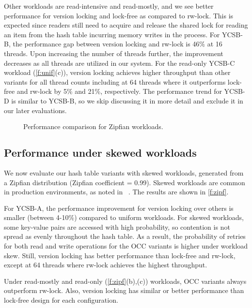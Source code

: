 Other workloads are read-intensive and read-mostly, and we see better
performance for version locking and lock-free as compared to rw-lock. This is expected since
readers still need to acquire and release the shared lock for reading an item from the
hash table incurring memory writes in the process. For YCSB-B, the performance gap between
version locking and rw-lock is 46\% at 16 threads. Upon increasing the number of threads
further, the improvement decreases as all threads are utilized in our system. For the
read-only YCSB-C workload (\autoref{f:unif}(c)), version locking achieves higher
throughput than other variants for all thread counts including at 64 threads where it
outperforms lock-free and rw-lock by 5\% and 21\%, respectively. The performance trend for
YCSB-D is similar to YCSB-B, so we skip discussing it in more detail and exclude it in our
later evaluations.


\begin{figure*}[t]
    \centering
    
    \caption{Performance comparison for Zipfian workloads.}
    \label{f:zipf}
    \vspace{-8pt}
\end{figure*}

\subsection{Performance under skewed workloads}
\label{s:eval:skew}
We now evaluate our hash table variants with skewed workloads, generated from
a Zipfian distribution (Zipfian coefficient = 0.99). Skewed workloads are common
in production environments, as noted in ~\cite{ycsb-cooper-socc10, hotring-chen-fast20}.
The results are shown in \autoref{f:zipf}.

For YCSB-A, the performance improvement for version locking over others is smaller
(between 4-10\%) compared to uniform workloads. For skewed workloads, some key-value
pairs are accessed with high probability, so contention is not spread as evenly throughout
the hash table. As a result, the probability of retries for both read and write
operations for the OCC variants is higher under workload skew. Still, version locking
has better performance than lock-free and rw-lock, except at 64 threads where rw-lock
achieves the highest throughput. 

Under read-mostly and read-only (\autoref{f:zipf}(b),(c)) workloads, OCC variants
always outperform rw-lock. Also, version locking has similar or better performance
than lock-free design for each configuration.

